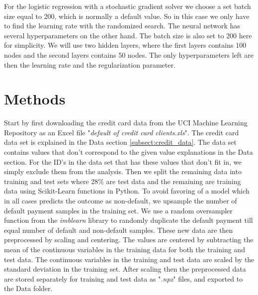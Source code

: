 \documentclass[12pt,a4paper,english]{article}
\begin{document}
For the logistic regression with a stochastic gradient solver we choose a set batch size equal to 200, which is normally a default value. So in this case we only have to find the learning rate with the randomized search. The neural network has several hyperparameters on the other hand. The batch size is also set to 200 here for simplicity. We will use two hidden layers, where the first layers contains 100 nodes and the second layers contains 50 nodes. The only hyperparameters left are then the learning rate and the regularization parameter.

\section{Methods}
Start by first downloading the credit card data from the UCI Machine Learning Repository \cite{UCI} as an Excel file "\textit{default of credit card clients.xls}". The credit card data set is explained in the Data section \ref{subsect:credit_data}. The data set contains values that don't correspond to the given value explanations in the Data section. For the ID's in the data set that has these values that don't fit in, we simply exclude them from the analysis. Then we split the remaining data into training and test sets where 28\% are test data and the remaining are training data using Scikit-Learn functions in Python. To avoid favoring of a model which in all cases predicts the outcome as non-default, we upsample the number of default payment samples in the training set. We use a random oversampler function from the \textit{imblearn} library to randomly duplicate the default payment till equal number of default and non-default samples. These new data are then preprocessed by scaling and centering. The values are centered by subtracting the mean of the continuous variables in the training data for both the training and test data. The continuous variables in the training and test data are scaled by the standard deviation in the training set. After scaling then the preprocessed data are stored separately for training and test data as "\textit{.npz}" files, and exported to the Data folder.
\end{document}
